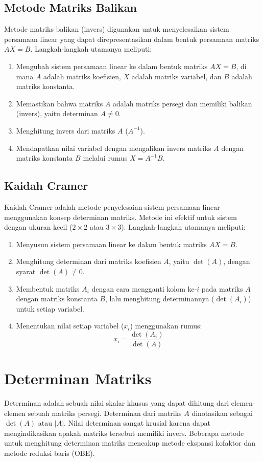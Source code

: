 \documentclass[12pt,a4paper]{report}
\begin{document}
\subsection{Metode Matriks Balikan}
Metode matriks balikan (invers) digunakan untuk menyelesaikan sistem persamaan linear yang dapat direpresentasikan dalam bentuk persamaan matriks $AX = B$. Langkah-langkah utamanya meliputi:
\begin{enumerate}
    \item Mengubah sistem persamaan linear ke dalam bentuk matriks $AX = B$, di mana $A$ adalah matriks koefisien, $X$ adalah matriks variabel, dan $B$ adalah matriks konstanta.
    \item Memastikan bahwa matriks $A$ adalah matriks persegi dan memiliki balikan (invers), yaitu determinan $A \neq 0$.
    \item Menghitung invers dari matriks $A$ ($A^{-1}$).
    \item Mendapatkan nilai variabel dengan mengalikan invers matriks $A$ dengan matriks konstanta $B$ melalui rumus $X = A^{-1}B$.
\end{enumerate}

\subsection{Kaidah Cramer}
Kaidah Cramer adalah metode penyelesaian sistem persamaan linear menggunakan konsep determinan matriks. Metode ini efektif untuk sistem dengan ukuran kecil ($2 \times 2$ atau $3 \times 3$). Langkah-langkah utamanya meliputi:
\begin{enumerate}
    \item Menyusun sistem persamaan linear ke dalam bentuk matriks $AX = B$.
    \item Menghitung determinan dari matriks koefisien $A$, yaitu $\det(A)$, dengan syarat $\det(A) \neq 0$.
    \item Membentuk matriks $A_i$ dengan cara mengganti kolom ke-$i$ pada matriks $A$ dengan matriks konstanta $B$, lalu menghitung determinannya ($\det(A_i)$) untuk setiap variabel.
    \item Menentukan nilai setiap variabel ($x_i$) menggunakan rumus:
    \[
    x_i = \frac{\det(A_i)}{\det(A)}
    \]
\end{enumerate}

\section{Determinan Matriks}
Determinan adalah sebuah nilai skalar khusus yang dapat dihitung dari elemen-elemen sebuah matriks persegi. Determinan dari matriks $A$ dinotasikan sebagai $\det(A)$ atau $|A|$. Nilai determinan sangat krusial karena dapat mengindikasikan apakah matriks tersebut memiliki invers. Beberapa metode untuk menghitung determinan matriks mencakup metode ekspansi kofaktor dan metode reduksi baris (OBE).
\end{document}
